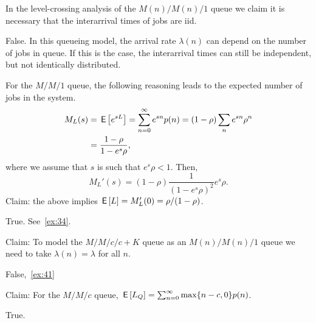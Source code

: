 \documentclass[stochastic-or.tex]{subfiles}
\begin{document}

\begin{truefalse}
In the level-crossing analysis of the $M(n)/M(n)/1$ queue we claim it is necessary that the interarrival times of jobs are iid.
\begin{solution}
False. In this queueing model, the arrival rate $\lambda(n)$ can depend on the number of jobs in queue. If this is the case, the interarrival times can still be independent, but not identically distributed.
\end{solution}
\end{truefalse}

\begin{truefalse}
For the $M/M/1$ queue, the following reasoning leads to the expected number of jobs in the system.
\begin{equation*}
 \begin{split}
 M_L(s)
&= \,\mathsf{E}\left[e^{s L}\right] = \sum_{n=0}^\infty e^{s n}p(n) = (1-\rho) \sum_n e^{s n} \rho^n \\
&=\frac{1-\rho}{1-e^{s}\rho},
 \end{split}
\end{equation*}
where we assume that $s$ is such that $e^s \rho < 1$. Then,
\begin{equation*}
 M_L'(s) = (1-\rho) \frac{1}{(1-e^s\rho)^2} e^s \rho.
\end{equation*}
Claim: the above implies  $\,\mathsf{E}\left[L\right] = M_L'(0) = \rho/(1-\rho)$.
\begin{solution}
True. See~\cref{ex:34}.
\end{solution}
\end{truefalse}

\begin{truefalse}
Claim: To model the $M/M/c/c+K$ queue as an $M(n)/M(n)/1$ queue we need to take $\lambda(n) = \lambda$ for all $n$.
\begin{solution} False,~\cref{ex:41}
\end{solution}
\end{truefalse}

\begin{truefalse}
Claim: For the $M/M/c$ queue, $\,\mathsf{E}\left[L_Q\right] = \sum_{n=0}^\infty \max\{n-c, 0\} p(n)$.
\begin{solution}
True.
\end{solution}
\end{truefalse}
\end{document}
